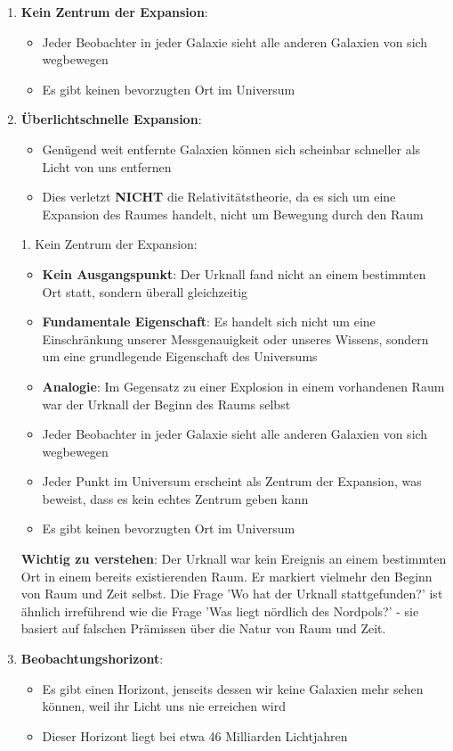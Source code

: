 \documentclass[a4paper,12pt]{article}
\begin{document}
	\begin{enumerate}
		\item \textbf{Kein Zentrum der Expansion}:
		\begin{itemize}
			\item Jeder Beobachter in jeder Galaxie sieht alle anderen Galaxien von sich wegbewegen
			\item Es gibt keinen bevorzugten Ort im Universum
		\end{itemize}
		
		\item \textbf{Überlichtschnelle Expansion}:
		\begin{itemize}
			\item Genügend weit entfernte Galaxien können sich scheinbar schneller als Licht von uns entfernen
			\item Dies verletzt \textbf{NICHT} die Relativitätstheorie, da es sich um eine Expansion des Raumes handelt, nicht um Bewegung durch den Raum
		\end{itemize}

	1. Kein Zentrum der Expansion:
	\begin{itemize}
		\item \textbf{Kein Ausgangspunkt}: Der Urknall fand nicht an einem bestimmten Ort statt, sondern überall gleichzeitig
		\item \textbf{Fundamentale Eigenschaft}: Es handelt sich nicht um eine Einschränkung unserer Messgenauigkeit oder unseres Wissens, sondern um eine grundlegende Eigenschaft des Universums
		\item \textbf{Analogie}: Im Gegensatz zu einer Explosion in einem vorhandenen Raum war der Urknall der Beginn des Raums selbst
		\item Jeder Beobachter in jeder Galaxie sieht alle anderen Galaxien von sich wegbewegen
		\item Jeder Punkt im Universum erscheint als Zentrum der Expansion, was beweist, dass es kein echtes Zentrum geben kann
		\item Es gibt keinen bevorzugten Ort im Universum
	\end{itemize}
	\textbf{Wichtig zu verstehen}: Der Urknall war kein Ereignis an einem bestimmten Ort in einem bereits existierenden Raum. Er markiert vielmehr den Beginn von Raum und Zeit selbst. Die Frage 'Wo hat der Urknall stattgefunden?' ist ähnlich irreführend wie die Frage 'Was liegt nördlich des Nordpols?' - sie basiert auf falschen Prämissen über die Natur von Raum und Zeit.	
		\item \textbf{Beobachtungshorizont}:
		\begin{itemize}
			\item Es gibt einen Horizont, jenseits dessen wir keine Galaxien mehr sehen können, weil ihr Licht uns nie erreichen wird
			\item Dieser Horizont liegt bei etwa 46 Milliarden Lichtjahren
		\end{itemize}
	\end{enumerate}
	
\end{document}
